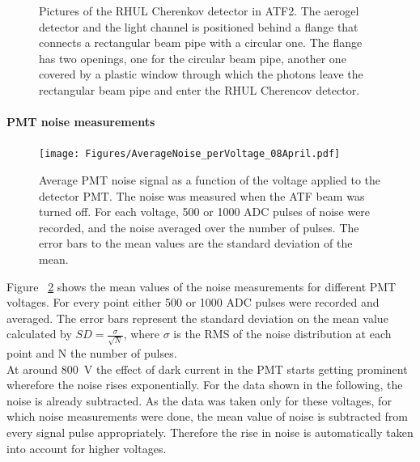 \begin{figure}
\begin{center}
\caption[Pictures of the RHUL Cherenkov detector]{Pictures of the RHUL Cherenkov detector in ATF2. The aerogel detector and the light channel is positioned behind a flange that connects a rectangular beam pipe with a circular one. The flange has two openings, one for the circular beam pipe, another one covered by a plastic window through which the photons leave the rectangular beam pipe and enter the RHUL Cherencov detector.}
\label{fig:RHUL_Cherenkov}
\end{center}
\end{figure}

\paragraph{PMT noise measurements}
\begin{figure}
\centering
\texttt{[image: Figures/AverageNoise\_perVoltage\_08April.pdf]}
\caption[RHUL Cherenkov detector noise]{Average PMT noise signal as a function of the voltage applied to the detector PMT. The noise was measured when the ATF beam was turned off. For each voltage, 500 or 1000 ADC pulses of noise were recorded, and the noise averaged over the number of pulses. The error bars to the mean values are the standard deviation of the mean.}
\label{fig:AverageNoise}
\end{figure}
Figure ~\ref{fig:AverageNoise} shows the mean values of the noise measurements for different PMT voltages. For every point either 500 or 1000 ADC pulses were recorded and averaged. The error bars represent the standard deviation on the mean value calculated by $SD=\frac{\sigma}{\sqrt{N}}$, where $\sigma$ is the RMS of the noise distribution at each point and N the number of pulses.\\
At around \SI{800}{\volt} the effect of dark current in the PMT starts getting prominent wherefore the noise rises exponentially. For the data shown in the following, the noise is already subtracted. As the data was taken only for these voltages, for which noise measurements were done, the mean value of noise is subtracted from every signal pulse appropriately. Therefore the rise in noise is automatically taken into account for higher voltages.

